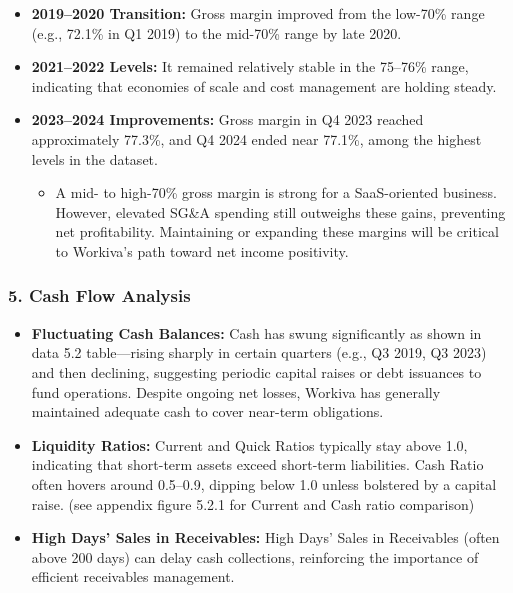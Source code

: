 \documentclass[
  10pt,
  a4paper,
]{article}
\providecommand{\tightlist}{%
  \setlength{\itemsep}{0pt}\setlength{\parskip}{0pt}}\usepackage{longtable,booktabs,array}
\begin{document}
\begin{itemize}
\tightlist
\item
  \textbf{2019--2020 Transition:} Gross margin improved from the
  low-70\% range (e.g., 72.1\% in Q1 2019) to the mid-70\% range by late
  2020.
\item
  \textbf{2021--2022 Levels:} It remained relatively stable in the
  75--76\% range, indicating that economies of scale and cost management
  are holding steady.
\item
  \textbf{2023--2024 Improvements:} Gross margin in Q4 2023 reached
  approximately 77.3\%, and Q4 2024 ended near 77.1\%, among the highest
  levels in the dataset.

  \begin{itemize}
  \tightlist
  \item
    A mid- to high-70\% gross margin is strong for a SaaS-oriented
    business. However, elevated SG\&A spending still outweighs these
    gains, preventing net profitability. Maintaining or expanding these
    margins will be critical to Workiva's path toward net income
    positivity.
  \end{itemize}
\end{itemize}

\subsubsection{5. Cash Flow Analysis}\label{cash-flow-analysis}

\begin{itemize}
\tightlist
\item
  \textbf{Fluctuating Cash Balances:} Cash has swung significantly as
  shown in data 5.2 table---rising sharply in certain quarters (e.g., Q3
  2019, Q3 2023) and then declining, suggesting periodic capital raises
  or debt issuances to fund operations. Despite ongoing net losses,
  Workiva has generally maintained adequate cash to cover near-term
  obligations.
\item
  \textbf{Liquidity Ratios:} Current and Quick Ratios typically stay
  above 1.0, indicating that short-term assets exceed short-term
  liabilities. Cash Ratio often hovers around 0.5--0.9, dipping below
  1.0 unless bolstered by a capital raise. (see appendix figure 5.2.1
  for Current and Cash ratio comparison)
\item
  \textbf{High Days' Sales in Receivables:} High Days' Sales in
  Receivables (often above 200 days) can delay cash collections,
  reinforcing the importance of efficient receivables management.
\end{itemize}
\end{document}
